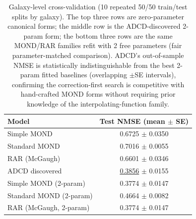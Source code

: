 \begin{table}[H]
\centering\footnotesize
\caption{Galaxy-level cross-validation (10 repeated 50/50 train/test splits by
galaxy). The top three rows are zero-parameter canonical forms; the middle row
is the ADCD-discovered 2-param form; the bottom three rows are the same MOND/RAR
families refit with 2 free parameters (fair parameter-matched comparison).
ADCD's out-of-sample NMSE is statistically indistinguishable from the best
2-param fitted baselines (overlapping $\pm$SE intervals), confirming the
correction-first search is competitive with hand-crafted MOND forms without
requiring prior knowledge of the interpolating-function family.}
\label{tab:sparc_cv}
\begin{tabular}{l c}
\toprule
\textbf{Model} & \textbf{Test NMSE} (mean $\pm$ SE) \\
\midrule
  Simple MOND & 0.6725 $\pm$ 0.0350 \\
  Standard MOND & 0.7016 $\pm$ 0.0055 \\
  RAR (McGaugh) & 0.6601 $\pm$ 0.0346 \\
  ADCD discovered & \underline{0.3856} $\pm$ 0.0155 \\
  Simple MOND (2-param) & 0.3774 $\pm$ 0.0147 \\
  Standard MOND (2-param) & 0.4664 $\pm$ 0.0082 \\
  RAR (McGaugh, 2-param) & 0.3774 $\pm$ 0.0147 \\
\bottomrule
\end{tabular}
\end{table}
